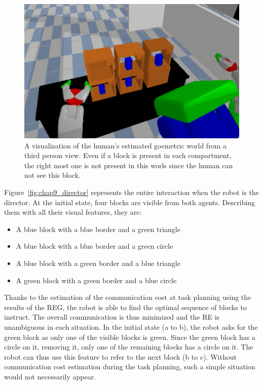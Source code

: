 \begin{figure}[ht!]
\centering
\includegraphics[scale=0.5]{figures/chapter9/robot_view.png}
\caption{\label{fig:chap9_robot_view} A visualization of the human's estimated goemetric world from a third person view. Even if a block is present in each compartment, the right most one is not present in this worls since the human can not see this block. }
\end{figure}

Figure~\ref{fig:chap9_director} represents the entire interaction when the robot is the director. At the initial state, four blocks are visible from both agents. Describing them with all their visual features, they are:

\begin{itemize}
  \item A blue block with a blue border and a green triangle
  \item A blue block with a blue border and a green circle
  \item A blue block with a green border and a blue triangle
  \item A green block with a green border and a blue circle
\end{itemize}

Thanks to the estimation of the communication cost at task planning using the results of the REG, the robot is able to find the optimal sequence of blocks to instruct. The overall communication is thus minimized and the RE is unambiguous in each situation. In the initial state (a to b), the robot asks for the green block as only one of the visible blocks is green. Since the green block has a circle on it, removing it, only one of the remaining blocks has a circle on it. The robot can thus use this feature to refer to the next block (b to c). Without communication cost estimation during the task planning, such a simple situation would not necessarily appear.

